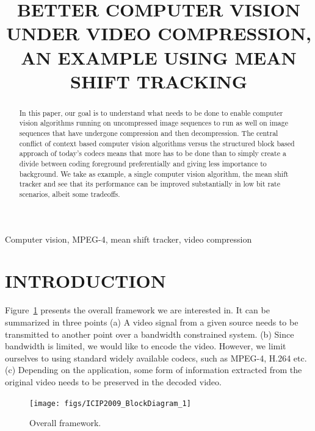 \documentclass{article}
\title{BETTER COMPUTER VISION UNDER VIDEO COMPRESSION, 
AN EXAMPLE USING MEAN SHIFT TRACKING
}
\begin{document}
\ninept

\maketitle
%
\begin{abstract}
In this paper, our goal is to understand what needs to be done to enable computer vision algorithms running on uncompressed image sequences to run as well on image sequences that have undergone compression and then decompression.    The central conflict of context based computer vision algorithms versus the structured block based approach of today's codecs means that more has to be done than to simply create a divide between coding foreground preferentially and giving less importance to background.  We take as example, a single computer vision algorithm, the mean shift tracker and see that its performance can be improved substantially in low bit rate scenarios, albeit some tradeoffs.  \end{abstract}
%
\begin{keywords}
Computer vision, MPEG-4, mean shift tracker, video compression
\end{keywords}

\section{INTRODUCTION}
Figure~\ref{fig:ProblemStatement} presents the overall framework we are interested in.  It can be summarized in three points (a) A video signal from a given source needs to be transmitted to another point over a bandwidth constrained system.  (b) Since bandwidth is limited, we would like to encode the video.  However, we limit ourselves to using standard widely available codecs, such as MPEG-4, H.264 etc. (c) Depending on the application, some form of information extracted from the original video needs to be preserved in the decoded video. 

\begin{figure}[h]
			\centering
			\texttt{[image: figs/ICIP2009\_BlockDiagram\_1]}
			\caption{Overall framework.}
			\label{fig:ProblemStatement}
\end{figure}
\end{document}
